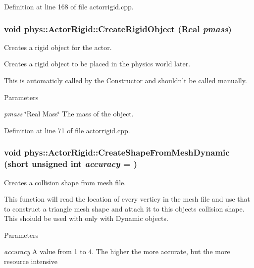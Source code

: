 Definition at line 168 of file actorrigid.cpp.

\hypertarget{classphys_1_1ActorRigid_a19227c52b972cd96ad69a7b6273e2bbf}{
\subsubsection[{CreateRigidObject}]{\setlength{\rightskip}{0pt plus 5cm}void phys::ActorRigid::CreateRigidObject ({\bf Real} {\em pmass})}}
\label{d8/d71/classphys_1_1ActorRigid_a19227c52b972cd96ad69a7b6273e2bbf}


Creates a rigid object for the actor. 

Creates a rigid object to be placed in the physics world later. \par
 This is automaticly called by the Constructor and shouldn't be called manually. 
\begin{DoxyParams}{Parameters}
\item[{\em pmass}]\char`\"{}Real Mass\char`\"{} The mass of the object. \end{DoxyParams}


Definition at line 71 of file actorrigid.cpp.

\hypertarget{classphys_1_1ActorRigid_aab4a408ce0724be6adf4c9f51f55f8a1}{
\subsubsection[{CreateShapeFromMeshDynamic}]{\setlength{\rightskip}{0pt plus 5cm}void phys::ActorRigid::CreateShapeFromMeshDynamic (short unsigned int {\em accuracy} = {})}}
\label{d8/d71/classphys_1_1ActorRigid_aab4a408ce0724be6adf4c9f51f55f8a1}


Creates a collision shape from mesh file. 

This function will read the location of every verticy in the mesh file and use that to construct a triangle mesh shape and attach it to this objects collision shape. This shoiuld be used with only with Dynamic objects. 
\begin{DoxyParams}{Parameters}
\item[{\em accuracy}]A value from 1 to 4. The higher the more accurate, but the more resource intensive \end{DoxyParams}


